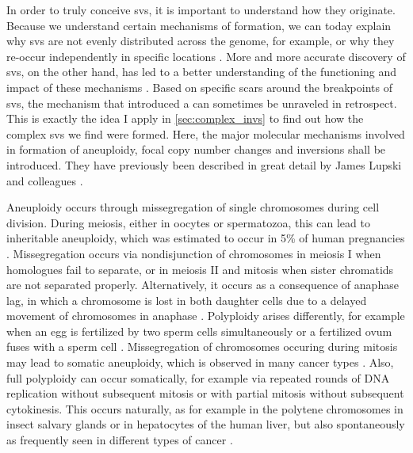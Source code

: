 In order to truly conceive \aclp{sv}, it is important to understand how they
originate. Because we understand certain mechanisms of formation, we
can today explain why \acp{sv} are not evenly distributed across the genome, for example, or
why they re-occur independently in specific locations \citep{Hastings2009}.
More and more accurate discovery of \acp{sv}, on the other hand, has led to
a better understanding of the functioning and impact of these mechanisms
\citep{Hastings2009,Abyzov2015}. Based on specific scars around the breakpoints
of \acp{sv}, the mechanism that introduced a \sv can sometimes be unraveled in
retrospect. This is exactly the idea I apply in \cref{sec:complex_invs} to find
out how the complex \acp{sv} we find were formed. Here, the major molecular
mechanisms involved in formation of aneuploidy, focal copy number changes and
inversions shall be introduced. They have previously been described in
great detail by James Lupski and colleagues \citep{Hastings2009,Carvalho2016}.

Aneuploidy occurs through missegregation of single chromosomes during cell
division. During meiosis, either in oocytes or spermatozoa, this can lead to
inheritable aneuploidy, which was estimated to occur in 5\% of human pregnancies
\citep{Templado2013}. Missegregation occurs via nondisjunction of chromosomes in
meiosis I when homologues fail to separate, or in meiosis II and mitosis when
sister chromatids are not separated properly. Alternatively, it occurs as a
consequence of anaphase lag, in which a chromosome is lost in both daughter
cells due to a delayed movement of chromosomes in anaphase \citep{webAneuploidy}.
Polyploidy arises differently, for example when an egg is fertilized by two
sperm cells simultaneously or a fertilized ovum fuses with a sperm cell
\citep{webAneuploidy}. Missegregation of chromosomes occuring during mitosis may
lead to somatic aneuploidy, which is observed in many cancer types
\citep{Gordon2012}. Also, full polyploidy can occur somatically, for example via
repeated rounds of DNA replication without subsequent mitosis or with partial
mitosis without subsequent cytokinesis. This occurs naturally, as for example
in the polytene chromosomes in insect salvary glands or in hepatocytes of the
human liver, but also spontaneously as frequently seen in different types of
cancer \citep{Davoli2011}.

